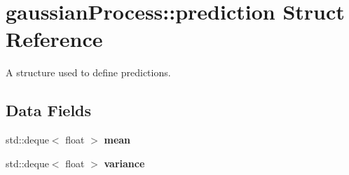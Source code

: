 \hypertarget{structgaussianProcess_1_1prediction}{
\section{gaussianProcess::prediction Struct Reference}
\label{structgaussianProcess_1_1prediction}
}


A structure used to define predictions.  


\subsection*{Data Fields}
\begin{DoxyCompactItemize}
\item 
\hypertarget{structgaussianProcess_1_1prediction_aad13e0df61f0726b20e7c7ac0ff7e323}{
std::deque$<$ float $>$ {\bfseries mean}}
\label{structgaussianProcess_1_1prediction_aad13e0df61f0726b20e7c7ac0ff7e323}

\item 
\hypertarget{structgaussianProcess_1_1prediction_a7bcc6ffb9cadaf15265252eb2ba6f072}{
std::deque$<$ float $>$ {\bfseries variance}}
\label{structgaussianProcess_1_1prediction_a7bcc6ffb9cadaf15265252eb2ba6f072}

\end{DoxyCompactItemize}
